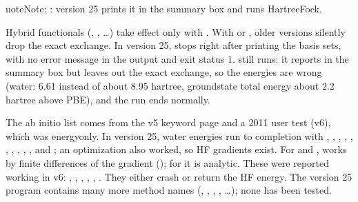 \documentclass[letterpaper,10pt,english,openany,oneside]{sphinxmanual}
\begin{document}
\begin{sphinxadmonition}{note}{Note:}
\sphinxAtStartPar
{}: version 25 prints it in the summary box and runs Hartree\textendash{}Fock.

\sphinxAtStartPar
{} Hybrid functionals (, , …) take effect only with . With 
or , older versions silently drop the exact exchange. In version 25,  stops right after
printing the basis sets, with no error message in the output and exit status 1.  still runs:
it reports  in the summary box but leaves out the exact exchange, so the energies are wrong (water:
 \sphinxhyphen{}6.61 instead of about \sphinxhyphen{}8.95 hartree, ground\sphinxhyphen{}state total energy about 2.2 hartree above PBE), and the run ends
normally.

\sphinxAtStartPar
The ab initio list comes from the v5 keyword page and a 2011 user test (v6), which was energy\sphinxhyphen{}only. In version 25,
water energies run to completion with , , , , , , , , ,
,  and ; an  optimization also worked, so HF gradients exist. For  and
,  works by finite differences of the gradient (); for  it is analytic. These
were reported  working in v6: , , , , , . They
either crash or return the HF energy. The version 25 program contains many more method names (,
, , , …); none has been tested.
\end{sphinxadmonition}
\end{document}
